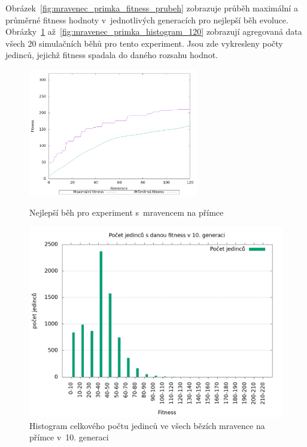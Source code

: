 Obrázek~\ref{fig:mravenec_primka_fitness_prubeh} zobrazuje průběh maximální a průměrné fitness hodnoty v~jednotlivých generacích pro nejlepší běh evoluce.
Obrázky~\ref{fig:mravenec_primka_histogram_10} až~\ref{fig:mravenec_primka_histogram_120} zobrazují agregovaná data všech 20 simulačních běhů pro tento experiment.
Jsou zde vykresleny počty jedinců, jejichž fitness spadala do daného rozsahu hodnot.

\begin{figure}[h]
    \begin{minipage}[c]{0.48\linewidth}
    {\includegraphics[width=20em]{obrazky/mravenec_primka_fitness_prubeh.png}}
        \caption{
        Nejlepší běh pro experiment s~mravencem na přímce
        }
        \label{fig:mravenec_primka_fitness_prubeh}

    \end{minipage}
    \hfill
    \begin{minipage}[c]{0.48\linewidth}
        \includegraphics[width=\linewidth]{obrazky/mravenec_primka_fitnessHistogram10.png}
        \caption{Histogram celkového počtu jedinců ve všech bězích mravence na přímce v~10. generaci}
        \label{fig:mravenec_primka_histogram_10}
    \end{minipage}
\end{figure}


